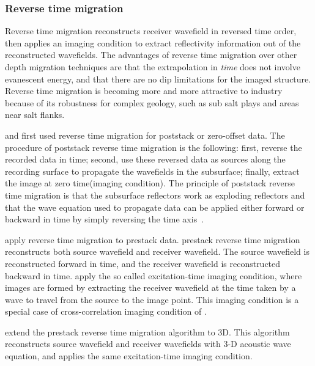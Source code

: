 
\subsubsection{Reverse time migration}

Reverse time migration reconstructs %
receiver wavefield in reversed time order, then applies an imaging condition to extract reflectivity information out of the reconstructed wavefields. 
The advantages of reverse time migration over other depth migration techniques are that the extrapolation in \emph{time} does not involve evanescent energy, and that there are no dip limitations for the imaged structure. Reverse time migration is becoming more and more attractive to industry because of its robustness for complex geology, such as sub salt plays and areas near salt flanks.



\cite{SEG-1983-S10.1} and \cite{GEO48-11-15141524} first used reverse time migration for poststack or zero-offset data. The procedure of poststack reverse time migration is the following: first, reverse the recorded data in time; second, use these reversed data as sources along the recording surface to propagate the wavefields in the subsurface; finally, extract the image at zero time(imaging condition). The principle of poststack reverse time migration is that the subsurface reflectors work as exploding reflectors and that the wave equation used to propagate data can be applied either forward or backward in time by simply reversing the time axis~\cite[]{levin:581}.


\cite{chang:67} apply reverse time migration to prestack data. prestack reverse time migration reconstructs both source wavefield and receiver wavefield. The source wavefield is reconstructed forward in time, and the receiver wavefield is reconstructed backward in time. \cite{chang:67} apply the so called excitation-time imaging condition, where images are formed by extracting the receiver wavefield at the time taken by a wave to travel from the source to the image point. This imaging condition is a special case of cross-correlation imaging condition of \cite{GEO36-03-04670481}.
 
\cite{chang:513} extend the prestack reverse time migration algorithm to 3D. This algorithm reconstructs source wavefield and receiver wavefields with 3-D acoustic wave equation, and applies the same excitation-time imaging condition.

